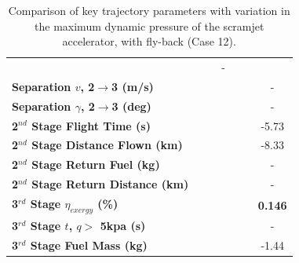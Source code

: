 \begin{table}[ht]
\begin{tabular}{l c c c c c c}
			& \secondthirdSeparationAltqFiftyFive
			& \secondthirdSeparationAltqSixty
			& -
			\\
			\textbf{Separation $v$, 2$\rightarrow$3 (m/s)}
			& \secondthirdSeparationvqForty
			& \secondthirdSeparationvqFortyFive
			& \secondthirdSeparationvqStandard
			& \secondthirdSeparationvqFiftyFive
			& \secondthirdSeparationvqSixty
			& -
			\\
			\textbf{Separation $\gamma$, 2$\rightarrow$3 (deg)}
			& \secondthirdSeparationgammaqForty
			& \secondthirdSeparationgammaqFortyFive
			& \secondthirdSeparationgammaqStandard
			& \secondthirdSeparationgammaqFiftyFive
			& \secondthirdSeparationgammaqSixty
			& -
			\\
			\textbf{2$^{nd}$ Stage Flight Time (s)}
			& \secondFlightTimeqForty
			& \secondFlightTimeqFortyFive
			& \secondFlightTimeqStandard
			& \secondFlightTimeqFiftyFive
			& \secondFlightTimeqSixty
			&-5.73
			\\
			\textbf{2$^{nd}$ Stage Distance Flown (km)}
			& \SecondDistqForty
			& \SecondDistqFortyFive
			& \SecondDistqStandard
			& \SecondDistqFiftyFive
			& \SecondDistqSixty
			&-8.33
			\\
			\textbf{2$^{nd}$ Stage Return Fuel (kg)}
			& \returnFuelqForty
			& \returnFuelqFortyFive
			& \returnFuelqStandard
			& \returnFuelqFiftyFive
			& \returnFuelqSixty
			& -
			\\
			\textbf{2$^{nd}$ Stage Return Distance (km)}
			& \returnDistqForty
			& \returnDistqFortyFive
			& \returnDistqStandard
			& \returnDistqFiftyFive
			& \returnDistqSixty
			& -
			\\
			\hline 
			\textbf{3$^{rd}$ Stage $\eta_{exergy}$ (\%)}
			& \textbf{\thirddExergyEffqForty}
			& \textbf{\thirddExergyEffqFortyFive}
			& \textbf{\thirddExergyEffqStandard}
			& \textbf{\thirddExergyEffqFiftyFive}
			& \textbf{\thirddExergyEffqSixty}
			& \textbf{0.146}
			\\
			\textbf{3$^{rd}$ Stage $t$, $q >$ 5kpa (s)}
			& \thirdqOverFiveqForty
			& \thirdqOverFiveqFortyFive
			& \thirdqOverFiveqStandard
			& \thirdqOverFiveqFiftyFive
			& \thirdqOverFiveqSixty
			& -
			\\
			\textbf{3$^{rd}$ Stage Fuel Mass (kg)}
			& \thirdmFuelqForty
			& \thirdmFuelqFortyFive
			& \thirdmFuelqStandard
			& \thirdmFuelqFiftyFive
			& \thirdmFuelqSixty
			&-1.44
			\\
			\hline 
		\end{tabular} 
	\caption{Comparison of key trajectory parameters with variation in the maximum dynamic pressure of the scramjet accelerator, with fly-back (Case 12).}
	\label{tab:qvarreturn}
\end{table}


